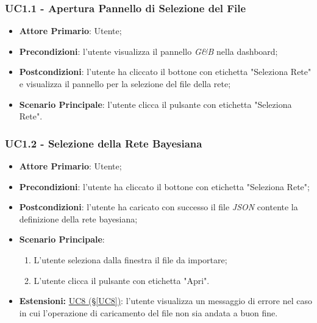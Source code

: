 \pagebreak

\subsubsection{UC1.1 - Apertura Pannello di Selezione del File}\label{UC1.1}
\begin{itemize}
	\item \textbf{Attore Primario}: Utente;
	\item \textbf{Precondizioni}: l'utente visualizza il pannello \textit{G\&B} nella dashboard;
	\item \textbf{Postcondizioni}: l'utente ha cliccato il bottone con etichetta "Seleziona Rete" e visualizza il pannello per la selezione del file della rete;
	\item \textbf{Scenario Principale}: l'utente clicca il pulsante con etichetta "Seleziona Rete".
\end{itemize}


\subsubsection{UC1.2 - Selezione della Rete Bayesiana}\label{UC1.2}
\begin{itemize}
	\item \textbf{Attore Primario}: Utente;
	\item \textbf{Precondizioni}: l'utente ha cliccato il bottone con etichetta "Seleziona Rete";
	\item \textbf{Postcondizioni}: l'utente ha caricato con successo il file \textit{JSON} contente la definizione della rete bayesiana;
	\item \textbf{Scenario Principale}:
	\begin{enumerate}
		\item L'utente seleziona dalla finestra il file da importare;
		\item L'utente clicca il pulsante con etichetta "Apri".
	\end{enumerate}
	\item \textbf{Estensioni:} \hyperref[UC8]{UC8 (§\ref*{UC8})}: l'utente visualizza un messaggio di errore nel caso in cui l'operazione di caricamento del file non sia andata a buon fine.
\end{itemize}

\pagebreak

